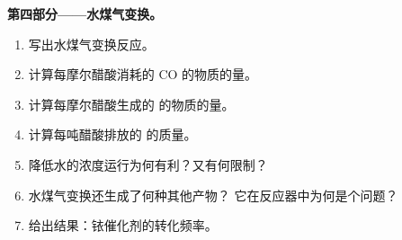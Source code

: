 \begin{problem}
\medskip\noindent\textbf{第四部分——水煤气变换。}
\begin{enumerate}[resume]
  \item 写出水煤气变换反应。
  \item 计算每摩尔醋酸消耗的 CO 的物质的量。
  \item 计算每摩尔醋酸生成的  的物质的量。
  \item 计算每吨醋酸排放的  的质量。
  \item 降低水的浓度运行为何有利？又有何限制？
  \item 水煤气变换还生成了何种其他产物？
        它在反应器中为何是个问题？
  \item 给出结果：铱催化剂的转化频率。
\end{enumerate}
\end{problem}
